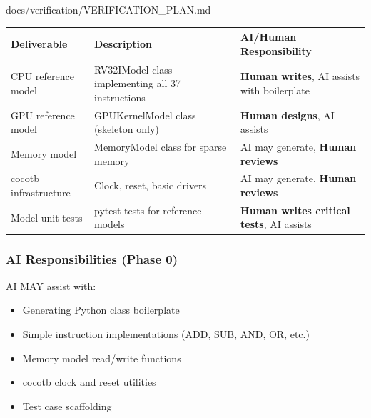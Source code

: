 \begin{relocated}{docs/verification/VERIFICATION_PLAN.md}
{
\begin{longtable}[]{@{}
  >{\centering\arraybackslash}p{}
  >{\centering\arraybackslash}p{}
  >{\centering\arraybackslash}p{}@{}}
\toprule\noalign{}
\begin{minipage}[b]{\linewidth}\centering
Deliverable
\end{minipage} & \begin{minipage}[b]{\linewidth}\centering
Description
\end{minipage} & \begin{minipage}[b]{\linewidth}\centering
AI/Human Responsibility
\end{minipage} \\
\midrule\noalign{}
\endhead
\bottomrule\noalign{}
\endlastfoot
CPU reference model & RV32IModel class implementing all 37 instructions
& \textbf{Human writes}, AI assists with boilerplate \\
GPU reference model & GPUKernelModel class (skeleton only) &
\textbf{Human designs}, AI assists \\
Memory model & MemoryModel class for sparse memory & AI may generate,
\textbf{Human reviews} \\
cocotb infrastructure & Clock, reset, basic drivers & AI may generate,
\textbf{Human reviews} \\
Model unit tests & pytest tests for reference models & \textbf{Human
writes critical tests}, AI assists \\
\end{longtable}
}

\subsubsection{AI Responsibilities (Phase 0)}\label{ds:ch:verification-plan:ai-responsibilities-phase-0}

AI MAY assist with:

\begin{itemize}
\tightlist
\item
  Generating Python class boilerplate
\item
  Simple instruction implementations (ADD, SUB, AND, OR, etc.)
\item
  Memory model read/\allowbreak{}write functions
\item
  cocotb clock and reset utilities
\item
  Test case scaffolding
\end{itemize}


\end{relocated}
